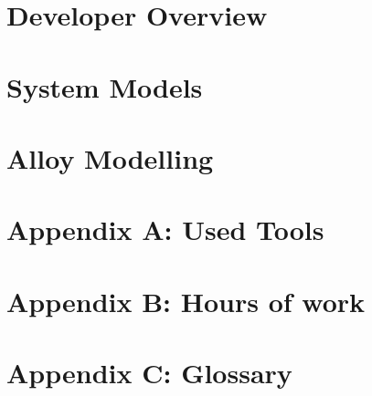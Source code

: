 \documentclass[openright]{report}
\begin{document}
	\chapter{Developer Overview}
		
	\chapter{System Models}
		
	\chapter{Alloy Modelling}
		




    \appendix
    \newpage
    \chapter{Appendix A: Used Tools}
	    

	\newpage
	\chapter{Appendix B: Hours of work}
	    

	\newpage
	\chapter{Appendix C: Glossary}
		

	\newpage
	\begin{thebibliography}{10}
		
	\end{thebibliography}
\end{document}
